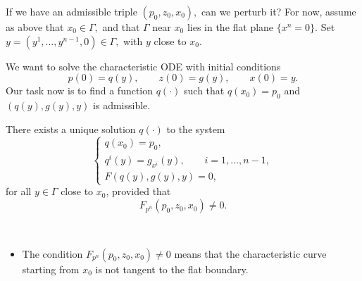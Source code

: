 If we have an admissible triple
$
(p_0,z_0,x_0),
$
can we perturb it?
For now, assume as above that
$
x_0\in \Gamma,
$
and that $\Gamma$ near $x_0$ lies in the flat plane
$
\{x^n=0\}.
$
Set
$
y=(y^1,\ldots,y^{n-1},0)\in \Gamma,
$
with $y$ close to $x_0$.

We want to solve the characteristic ODE with initial conditions
$$
p(0)=q(y),\qquad z(0)=g(y),\qquad x(0)=y.
$$
Our task now is to find a function $q(\cdot)$ such that
$
q(x_0)=p_0
$
and
$
(q(y),g(y),y)
$
is admissible.

\begin{lemma}
There exists a unique solution $q(\cdot)$ to the system
$$
\begin{cases}
q(x_0)=p_0,\\
q^i(y)=g_{x^i}(y), \qquad i=1,\ldots,n-1,\\
F(q(y),g(y),y)=0,
\end{cases}
$$
for all $y\in \Gamma$ close to $x_0$, provided that
$$
F_{p^n}(p_0,z_0,x_0)\neq 0.
$$
\end{lemma}

\begin{remark}\
    \begin{itemize}
        \item The condition
        $
        F_{p^n}(p_0,z_0,x_0)\neq 0
        $
        means that the characteristic curve starting from $x_0$ is not tangent to the flat boundary.
    \end{itemize}

\end{remark}

